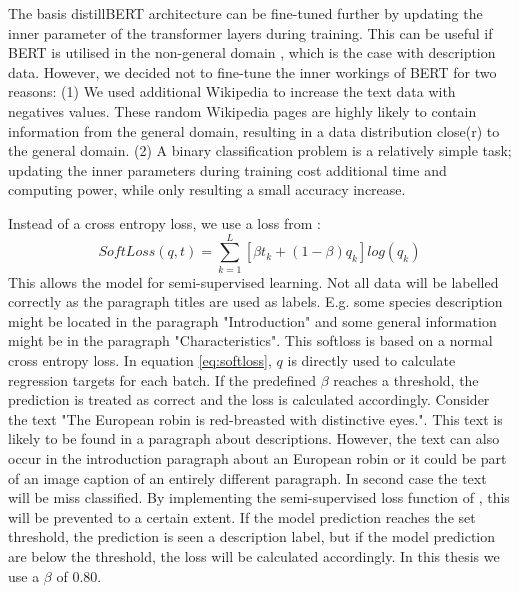 \documentclass[a4paper, 12pt, oneside]{book} %
\begin{document}
The basis distillBERT architecture can be fine-tuned further by updating the inner parameter of the transformer layers during training. 
This can be useful if BERT is utilised in the non-general domain \autocite{devlin_bert_2019, sun_how_2020, sanh_distilbert_2020}, which is the case with description data.
However, we decided not to fine-tune the inner workings of BERT for two reasons: 
(1) We used additional Wikipedia to increase the text data with negatives values.
These random Wikipedia pages are highly likely to contain information from the general
domain, resulting in a  data distribution close(r) to the general domain.
(2) A binary classification problem is a relatively simple task; updating the inner parameters during training cost additional time and computing power, while only resulting a small accuracy increase.

Instead of a cross entropy loss, we use a loss from \textcite{reed_training_2015}:
\begin{equation} \label{eq:softloss}
 SoftLoss(q, t) = \sum_{k=1}^{L}[\beta t _k + (1- \beta )q _k]log(q _k)
\end{equation}
This allows the model for semi-supervised learning.
Not all data will be labelled correctly as the paragraph titles are used as labels.
E.g. some species description might be located in the paragraph "Introduction" and some general information might be in the paragraph "Characteristics".
This softloss is based on a normal cross entropy loss.
In equation \ref{eq:softloss}, \(q\) is directly used to calculate regression targets for each batch.
If the predefined \(\beta\) reaches a threshold, the prediction is treated as correct and the loss is calculated accordingly.
Consider the text "The European robin is red-breasted with distinctive eyes.".
This text is likely to be found in a paragraph about descriptions.
However, the text can also occur in the introduction paragraph about an European robin or it could be part of an image caption of an entirely different paragraph. 
In second case the text will be miss classified. 
By implementing the semi-supervised loss function of \textcite{reed_training_2015}, this will be prevented to a certain extent.
If the model prediction reaches the set threshold, the prediction is seen a description label, but if the model prediction are below the threshold, the loss will be calculated accordingly.
In this thesis we use a \(\beta\) of 0.80. 
\end{document}
